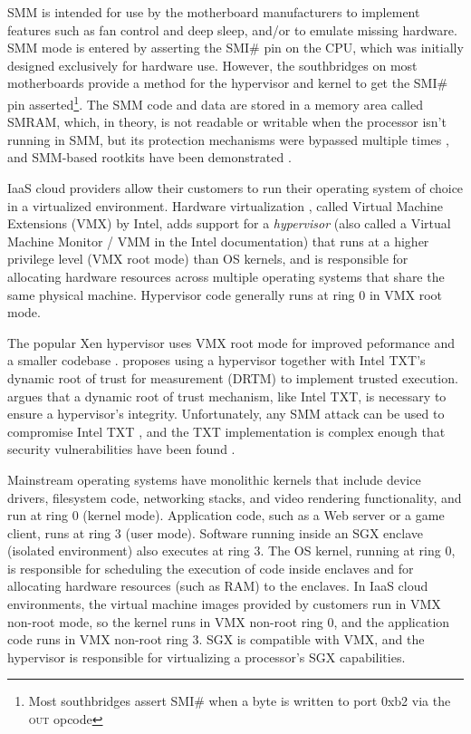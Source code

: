 SMM is intended for use by the motherboard manufacturers to implement features
such as fan control and deep sleep, and/or to emulate missing hardware. SMM
mode is entered by asserting the SMI\# pin on the CPU, which was initially
designed exclusively for hardware use. However, the southbridges on most
motherboards provide a method for the hypervisor and kernel to get the SMI\#
pin asserted\footnote{Most southbridges assert SMI\# when a byte is written to
port 0xb2 via the \textsc{out} opcode}. The SMM code and data are stored in a
memory area called SMRAM, which, in theory, is not readable or writable when
the processor isn't running in SMM, but its protection mechanisms were bypassed
multiple times \cite{duflot2006smm} \cite{rutkowska2008remap}
\cite{wojtczuk2009smm}, and SMM-based rootkits have been demonstrated
\cite{wecherowski2009smm} \cite{embleton2010smm}.

IaaS cloud providers allow their customers to run their operating system of
choice in a virtualized environment. Hardware virtualization
\cite{uhlig2005intel}, called Virtual Machine Extensions (VMX) by Intel,
adds support for a \textit{hypervisor} (also called a Virtual Machine Monitor
/ VMM in the Intel documentation) that runs at a higher privilege level
(VMX root mode) than OS kernels, and is responsible for allocating hardware
resources across multiple operating systems that share the same physical
machine. Hypervisor code generally runs at ring 0 in VMX root mode.

The popular Xen hypervisor uses VMX root mode for improved peformance and a
smaller codebase \cite{zhang2008xen}. \cite{mccune2010trustvisor} proposes
using a hypervisor together with Intel TXT's dynamic root of trust for
measurement (DRTM) to implement trusted execution.
\cite{vasudevan2010requirements} argues that a dynamic root of trust mechanism,
like Intel TXT, is necessary to ensure a hypervisor's integrity. Unfortunately,
any SMM attack can be used to compromise Intel TXT \cite{wojtczuk2009txt}, and
the TXT implementation is complex enough that security vulnerabilities have
been found \cite{wojtczuk2009txt2} \cite{wojtczuk2011txt}.

Mainstream operating systems have monolithic kernels that include device
drivers, filesystem code, networking stacks, and video rendering functionality,
and run at ring 0 (kernel mode). Application code, such as a Web server or
a game client, runs at ring 3 (user mode). Software running inside an SGX
enclave (isolated environment) also executes at ring 3. The OS kernel, running
at ring 0, is responsible for scheduling the execution of code inside enclaves
and for allocating hardware resources (such as RAM) to the enclaves. In IaaS
cloud environments, the virtual machine images provided by customers run in VMX
non-root mode, so the kernel runs in VMX non-root ring 0, and the application
code runs in VMX non-root ring 3. SGX is compatible with VMX, and the
hypervisor is responsible for virtualizing a processor's SGX capabilities.


